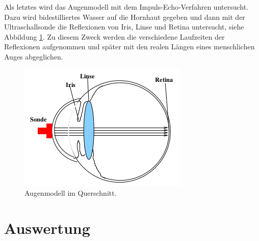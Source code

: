Als letztes wird das Augenmodell mit dem Impuls-Echo-Verfahren untersucht. Dazu wird
bidestilliertes Wasser auf die Hornhaut gegeben und dann mit der Ultraschallsonde
die Reflexionen von Iris, Linse und Retina untersucht, siehe Abbildung \ref{fig:3}.
Zu diesem Zweck werden die verschiedene Laufzeiten der Reflexionen aufgenommen und
später mit den realen Längen eines menschlichen Auges abgeglichen.
\begin{figure}
  \centering
  \includegraphics[scale=0.5]{auge.png}
  \caption{Augenmodell im Querschnitt.}
  \label{fig:3}
\end{figure}
\section{Auswertung}
